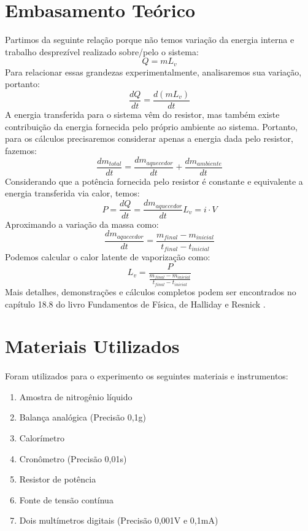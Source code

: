 \documentclass[brazilian,12pt,a4paper,final]{article}
\begin{document}
\section{Embasamento Teórico}
\label{embas}
Partimos da seguinte relação porque não temos variação da energia interna e trabalho desprezível realizado sobre/pelo o sistema:
$$
    Q = mL_v
$$
Para relacionar essas grandezas experimentalmente, analisaremos sua variação, portanto:
$$
    \frac{dQ}{dt} = \frac{d(mL_v)}{dt}
$$
\newpage
A energia transferida para o sistema vêm do resistor, mas também existe contribuição da energia fornecida pelo próprio ambiente ao sistema. Portanto, para os cálculos precisaremos considerar apenas a energia dada pelo resistor, fazemos:
$$
    \frac{dm_{total}}{dt} = \frac{dm_{aquecedor}}{dt} + \frac{dm_{ambiente}}{dt}
$$
Considerando que a potência fornecida pelo resistor é constante e equivalente a energia transferida via calor, temos:
$$
    P = \frac{dQ}{dt} = \frac{dm_{aquecedor}}{dt}L_v = i \cdot V
$$
Aproximando a variação da massa como:
$$
    \frac{dm_{aquecedor}}{dt} = \frac{m_{final} - m_{inicial}}{t_{final} - t_{inicial}}
$$
Podemos calcular o calor latente de vaporização como:
$$
    L_v = \frac{P}{\frac{m_{final} - m_{inicial}}{t_{final} - t_{inicial}}}
$$
Mais detalhes, demonstrações e cálculos completos podem ser encontrados no capítulo 18.8 do livro Fundamentos de Física, de Halliday e Resnick \cite{Halliday - 9 ed}.

\section{Materiais Utilizados}
\paragraph{}
Foram utilizados para o experimento os seguintes materiais e instrumentos:
\begin{enumerate}
    \item Amostra de nitrogênio líquido
    \item Balança analógica (Precisão 0,1g)
    \item Calorímetro
    \item Cronômetro (Precisão 0,01s)
    \item Resistor de potência
    \item Fonte de tensão contínua
    \item Dois multímetros digitais (Precisão 0,001V e 0,1mA) 
\end{enumerate}
\end{document}
